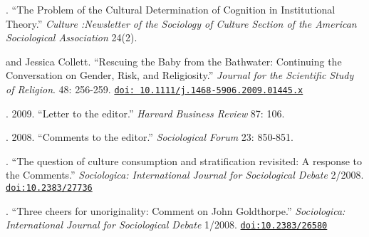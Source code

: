 .  ``The Problem of the Cultural Determination of Cognition in Institutional Theory.'' \emph{Culture :Newsletter of the Sociology of Culture Section of the American Sociological Association} 24(2).

 and Jessica Collett.  ``Rescuing the Baby from the Bathwater: Continuing the Conversation on Gender, Risk, and Religiosity.'' {\em Journal for the Scientific Study of Religion}. 48: 256-259. \href{https://doi.org/10.1111/j.1468-5906.2009.01445.x}{\nolinkurl{doi: 10.1111/j.1468-5906.2009.01445.x}}

 .  2009. ``Letter to the editor.''  {\em Harvard Business Review} 87: 106.

 .  2008. ``Comments to the editor.''  {\em Sociological Forum} 23: 850-851.

 . ``The question of culture consumption and stratification revisited: A response to the Comments.'' {\em Sociologica: International Journal for Sociological Debate} 2/2008. \href{https://www.rivisteweb.it/doi/10.2383/27736}{\nolinkurl{doi:10.2383/27736}} 
 
 .  ``Three cheers for unoriginality: Comment on John Goldthorpe.'' {\em Sociologica: International Journal for Sociological Debate} 1/2008. \href{https://www.rivisteweb.it/doi/10.2383/26580}{\nolinkurl{doi:10.2383/26580}} 
